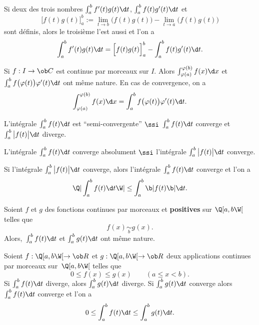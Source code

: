 Si deux des trois nombres $\int_a^bf'(t)g(t)\d t$, $\int_a^bf(t)g'(t)\d t$ et 
$$
\Big[f(t)g(t)\Big]_a^b:=\lim\limits_{t\to b}\Big(f(t)g(t)\Big)-\lim\limits_{t\to a}\Big(f(t)g(t)\Big)
$$
sont d\'efinis, alors le troisi\`eme l'est aussi et l'on a 
$$
\int_a^bf'(t)g(t)\d t=\Big[f(t)g(t)\Big]_a^b-\int_a^bf(t)g'(t)\d t. 
$$

\medskip
{}
Si $f:I\to\ob C$ est continue par morceaux sur $I$. 
Alors $\int_{\varphi(a)}^{\varphi(b)}f(x)\d x$ et $\int_a^bf\big(\varphi(t)\big)\varphi'(t)\d t$ 
ont m\^eme nature. En cas de convergence, on a 
$$
\int_{\varphi(a)}^{\varphi(b)}f(x)\d x=\int_a^bf\big(\varphi(t)\big)\varphi'(t)\d t.
$$

\medskip
\Propriete L'int\'egrale $\int_a^bf(t)\d t$ est ``semi-convergente'' $\ssi$ $\int_a^bf(t)\d t$ converge et $\int_a^b\big|f(t)\big|\d t$ diverge.

\medskip
\Propriete L'int\'egrale $\int_a^bf(t)\d t$ converge absolument $\ssi$ l'int\'egrale $\int_a^b\big|f(t)\big|\d t$ converge. 

\medskip
{}
Si l'int\'egrale $\int_a^b\big|f(t)\big|\d t$ converge, alors l'int\'egrale $\int_a^bf(t)\d t$ converge et l'on a 
$$
\Q|\int_a^bf(t)\d t\W|\le \int_a^b\b|f(t)\b|\d t. 
$$

\medskip
\Theoreme [$a\in\ob R$ et $b>a$ un \'el\'ement de $\ol R$] 
Soient $f$ et $g$ des fonctions continues par morceaux et {\bf positives} sur $\Q[a,b\W[$ telles que 
$$
f(x)\mathop{\sim}\limits_bg(x).
$$ 
Alors,~$\int_a^bf(t)\d t$ et $\int_a^bg(t)\d t$ ont m\^eme nature. 

\medskip
\Propriete [$a\in\ob R$, $b>a$ un \'el\'ement de $\ol R$] 
Soient $f:\Q[a,b\W[\to\ob R$ et $g:\Q[a,b\W[\to\ob R$ deux applications continues par morceaux sur~$\Q[a,b\W[$ telles que 
$$
0\le f(x)\le g(x)\qquad (a\le x<b). 
$$
Si $\int_a^bf(t)\d t$ diverge, alors $\int_a^bg(t)\d t$ diverge. \medskip\noindent
Si $\int_a^bg(t)\d t$ converge alors $\int_a^bf(t)\d t$ converge et l'on a 
$$
0\le \int_a^bf(t)\d t\le \int_a^bg(t)\d t. 
$$ 

